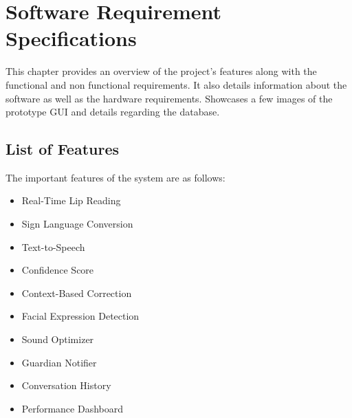 \documentclass{FastFyp}
\begin{document}
\chapter{Software Requirement Specifications}
\label{ch:srs}
This chapter provides an overview of the project's features along with the functional and non functional requirements. It also details information about the software as well as the hardware requirements. Showcases a few images of the prototype GUI and details regarding the database.


\section{List of Features}
The important features of the system are as follows:
\begin{itemize}
  \item Real-Time Lip Reading
  \item Sign Language Conversion
  \item Text-to-Speech 
  \item Confidence Score
  \item Context-Based Correction
  \item Facial Expression Detection
  \item Sound Optimizer
  \item Guardian Notifier
  \item Conversation History
  \item Performance Dashboard 
\end{itemize}
\end{document}
